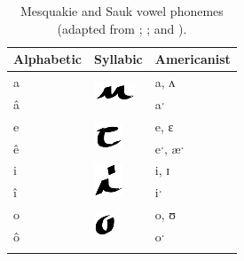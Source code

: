 \documentclass[output=paper]{LSP/langsci}
\begin{document}
\begin{table}
\begin{tabular}{lll}
\lsptoprule
Alphabetic & Syllabic & Americanist\\
\midrule
a & \multirow{2}{*}{\includegraphics{figures/Danker2a}} & a, ʌ\\
â && aˑ\\
e & \multirow{2}{*}{\includegraphics{figures/Danker2e}} & e, ɛ\\
ê && eˑ, æˑ\\
i & \multirow{2}{*}{\includegraphics{figures/Danker2i}} & i, ɪ\\
î && iˑ\\
o & \multirow{2}{*}{\includegraphics{figures/Danker2o}} & o, ʊ\\
ô && oˑ\\
\lspbottomrule
\end{tabular}
\caption{Mesquakie and Sauk vowel phonemes (adapted from \citealt{NatLangMeskSauk}; \citealt{Susman1939}; and \citealt{Jones1906}).}
\label{mesquakiesaukvowels}
\end{table}
\end{document}
